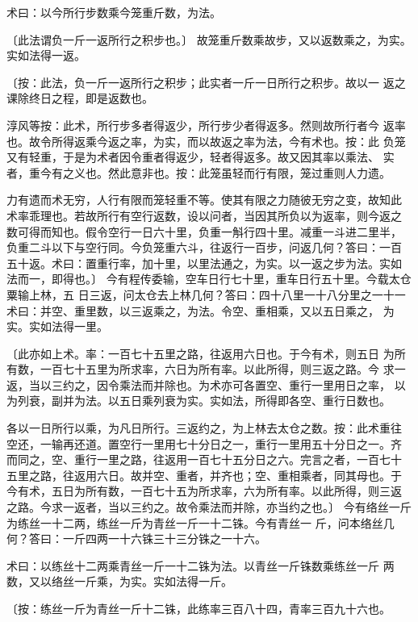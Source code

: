\documentclass[a4paper,12pt,UTF8,twoside]{ctexbook}
\begin{document}
术曰：以今所行步数乘今笼重斤数，为法。

〔此法谓负一斤一返所行之积步也。〕 故笼重斤数乘故步，又以返数乘之，为实。实如法得一返。

〔按：此法，负一斤一返所行之积步；此实者一斤一日所行之积步。故以一 返之课除终日之程，即是返数也。

淳风等按：此术，所行步多者得返少，所行步少者得返多。然则故所行者今 返率也。故令所得返乘今返之率，为实，而以故返之率为法，今有术也。按：此 负笼又有轻重，于是为术者因令重者得返少，轻者得返多。故又因其率以乘法、 实者，重今有之义也。然此意非也。按：此笼虽轻而行有限，笼过重则人力遗。

力有遗而术无穷，人行有限而笼轻重不等。使其有限之力随彼无穷之变，故知此 术率乖理也。若故所行有空行返数，设以问者，当因其所负以为返率，则今返之 数可得而知也。假令空行一日六十里，负重一斛行四十里。减重一斗进二里半， 负重二斗以下与空行同。今负笼重六斗，往返行一百步，问返几何？答曰：一百 五十返。术曰：置重行率，加十里，以里法通之，为实。以一返之步为法。实如 法而一，即得也。〕 今有程传委输，空车日行七十里，重车日行五十里。今载太仓粟输上林，五 日三返，问太仓去上林几何？答曰：四十八里一十八分里之一十一 术曰：并空、重里数，以三返乘之，为法。令空、重相乘，又以五日乘之， 为实。实如法得一里。

〔此亦如上术。率：一百七十五里之路，往返用六日也。于今有术，则五日 为所有数，一百七十五里为所求率，六日为所有率。以此所得，则三返之路。今 求一返，当以三约之，因令乘法而并除也。为术亦可各置空、重行一里用日之率， 以为列衰，副并为法。以五日乘列衰为实。实如法，所得即各空、重行日数也。

各以一日所行以乘，为凡日所行。三返约之，为上林去太仓之数。按：此术重往 空还，一输再还道。置空行一里用七十分日之一，重行一里用五十分日之一。齐 而同之，空、重行一里之路，往返用一百七十五分日之六。完言之者，一百七十 五里之路，往返用六日。故并空、重者，并齐也；空、重相乘者，同其母也。于 今有术，五日为所有数，一百七十五为所求率，六为所有率。以此所得，则三返 之路。今求一返者，当以三约之。故令乘法而并除，亦当约之也。〕 今有络丝一斤为练丝一十二两，练丝一斤为青丝一斤一十二铢。今有青丝一 斤，问本络丝几何？答曰：一斤四两一十六铢三十三分铢之一十六。

术曰：以练丝十二两乘青丝一斤一十二铢为法。以青丝一斤铢数乘练丝一斤 两数，又以络丝一斤乘，为实。实如法得一斤。

〔按：练丝一斤为青丝一斤十二铢，此练率三百八十四，青率三百九十六也。
\end{document}
